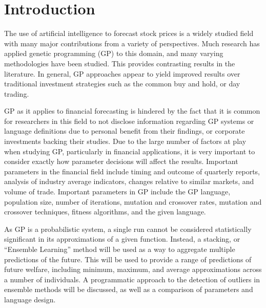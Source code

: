 \documentclass[12pt, letterpaper]{article}
\begin{document}
\newpage

\tableofcontents

\newpage

\listoffigures

\newpage

\listoftables

\newpage 

\section{Introduction}

\textrm{ \indent The use of artificial intelligence to forecast stock prices is a widely studied field with many major contributions from a variety of perspectives. Much research has applied genetic programming (GP) to this domain, and many varying methodologies have been studied. This provides contrasting results in the literature. In general, GP approaches appear to yield improved results over traditional investment strategies such as the common buy and hold, or day trading. }

\textrm{ \indent GP as it applies to financial forecasting is hindered by the fact that it is common for researchers in this field to not disclose information regarding GP systems or language definitions due to personal benefit from their findings, or corporate investments backing their studies. Due to the large number of factors at play when studying GP, particularly in financial applications, it is very important to consider exactly how parameter decisions will affect the results. Important parameters in the financial field include timing and outcome of quarterly reports, analysis of industry average indicators, changes relative to similar markets, and volume of trade. Important parameters in GP include the GP language, population size, number of iterations, mutation and crossover rates, mutation and crossover techniques, fitness algorithms, and the given language. }

\textrm{ \indent As GP is a probabilistic system, a single run cannot be considered statistically significant in its approximations of a given function. Instead, a stacking, or ``Ensemble Learning'' method will be used as a way to aggregate multiple predictions of the future. This will be used to provide a range of predictions of future welfare, including minimum, maximum, and average approximations across a number of individuals. A programmatic approach to the detection of outliers in ensemble methods will be discussed, as well as a comparison of parameters and language design. }
\end{document}
